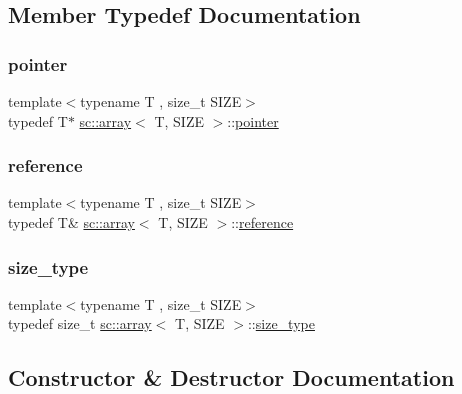 \subsection{Member Typedef Documentation}
\mbox{\label{classsc_1_1array_a002fbbd9c16ad364964833f723b0d582}} 
\subsubsection{\texorpdfstring{pointer}{pointer}}
{\footnotesize\ttfamily template$<$typename T , size\+\_\+t S\+I\+ZE$>$ \\
typedef T$\ast$ \hyperlink{classsc_1_1array}{sc\+::array}$<$ T, S\+I\+ZE $>$\+::\hyperlink{classsc_1_1array_a002fbbd9c16ad364964833f723b0d582}{pointer}}

\mbox{\label{classsc_1_1array_ae7d6903e3e7b850083c836e5061ac785}} 
\subsubsection{\texorpdfstring{reference}{reference}}
{\footnotesize\ttfamily template$<$typename T , size\+\_\+t S\+I\+ZE$>$ \\
typedef T\& \hyperlink{classsc_1_1array}{sc\+::array}$<$ T, S\+I\+ZE $>$\+::\hyperlink{classsc_1_1array_ae7d6903e3e7b850083c836e5061ac785}{reference}}

\mbox{\label{classsc_1_1array_a6358115a468f72263895bbb17c924718}} 
\subsubsection{\texorpdfstring{size\+\_\+type}{size\_type}}
{\footnotesize\ttfamily template$<$typename T , size\+\_\+t S\+I\+ZE$>$ \\
typedef size\+\_\+t \hyperlink{classsc_1_1array}{sc\+::array}$<$ T, S\+I\+ZE $>$\+::\hyperlink{classsc_1_1array_a6358115a468f72263895bbb17c924718}{size\+\_\+type}}



\subsection{Constructor \& Destructor Documentation}
\mbox{\label{classsc_1_1array_aa252df95ea94ad054efe2861d830de91}} 

